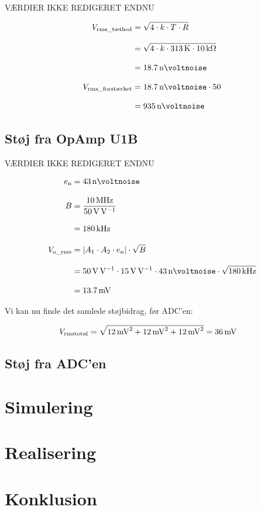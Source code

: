 \documentclass[a4paper, 11pt, article,oneside,openany]{memoir} %
\newcommand{\tsub}[1]{_{\textup{#1}}}
\begin{document}
VÆRDIER IKKE REDIGERET ENDNU

\begin{align*}
V\tsub{rms\_tæthed} &= \sqrt{4 \cdot k \cdot T \cdot R}
\\[2.0ex]
&= \sqrt{4 \cdot k\cdot \SI{313}{\kelvin} \cdot \SI{10}{\kilo\ohm}}
\\[2.0ex]
&= \SI{18.7}{\nano\voltnoise}
\\[2.0ex]
V\tsub{rms\_forstærket} &= \SI{18.7}{\nano\voltnoise} \cdot 50
\\[2.0ex]
&= \SI{935}{\nano\voltnoise}
\end{align*}

\subsection{Støj fra OpAmp U1B}

VÆRDIER IKKE REDIGERET ENDNU

\begin{align*}
e\tsub{n} &= \SI{43}{\nano\voltnoise}
\\[2.0ex]
B &= \frac{ \SI{10}{\mega\hertz}}{\SI{50}{\volt\per\volt}}
\\[2.0ex]
&= \SI{180}{\kilo\hertz}
\\[2.0ex]
V\tsub{o\_rms} &= \left| A_1\cdot A_2 \cdot e\tsub{n} \right| \cdot \sqrt{B}
\\[2.0ex]
&= \SI{50}{\volt\per\volt} \cdot \SI{15}{\volt\per\volt} \cdot \SI{43}{\nano\voltnoise} \cdot \sqrt{\SI{180}{\kilo\hertz}}
\\[2.0ex]
&= \SI{13.7}{\milli\volt}
\end{align*}

Vi kan nu finde det samlede støjbidrag, før ADC'en:

\begin{align*}
V\tsub{rmstotal} &= \sqrt{\SI{12}{\milli\volt^2} + \SI{12}{\milli\volt^2} + \SI{12}{\milli\volt^2}} = \SI{36}{\milli\volt}
\end{align*}


\subsection{Støj fra ADC'en}





\section{Simulering}

\section{Realisering}

\section{Konklusion}
\end{document}
